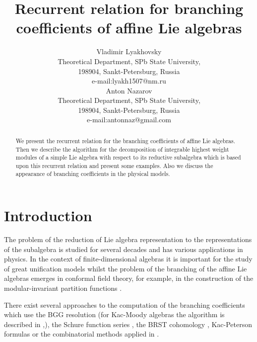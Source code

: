 \documentclass[a4paper,12pt]{article}
\theoremstyle{definition} \newtheorem{Def}{Definition}
\begin{document}
\title{\textbf{{\Large {Recurrent relation for branching coefficients of affine Lie algebras}}}}
\author{Vladimir Lyakhovsky\\
Theoretical Department, SPb State University,\\
198904, Sankt-Petersburg, Russia \\
e-mail:lyakh1507@nm.ru \\
[5mm] Anton Nazarov \\
Theoretical Department, SPb State University,\\
198904, Sankt-Petersburg, Russia \\
e-mail:antonnaz@gmail.com\\
}
\maketitle

\begin{abstract}
  We present the recurrent relation for the branching coefficients of affine Lie algebras. Then we describe the algorithm for the decomposition of  integrable highest weight modules
of a simple Lie algebra with respect to its reductive subalgebra which is based upon this recurrent relation and present some examples. Also we discuss the appearance of branching coefficients in the physical models.
\end{abstract}


\section{Introduction}
\label{sec:introduction}

The problem of the reduction of Lie algebra representation to the representations of the subalgebra is studied for several decades and has various applications in physics. In the context of finite-dimensional algebras it is important for the study of great unification models whilst the problem of the branching of the affine Lie algebras emerges in conformal field theory, for example, in the construction of the modular-invariant partition functions \cite{difrancesco1997cft}.

There exist several approaches to the computation of the branching coefficients which use the BGG
resolution \cite{bernstein1975differential} (for Kac-Moody algebras the algorithm is described in 
\cite{kac1990idl},\cite{wakimoto2001idl}), the Schure function series \cite{fauser2006new}, the BRST
cohomology \cite{hwang1994general}, Kac-Peterson formulas \cite{kac1990idl,quella2002branching} or the
combinatorial methods applied in \cite{feigin707principal}. 
\end{document}
